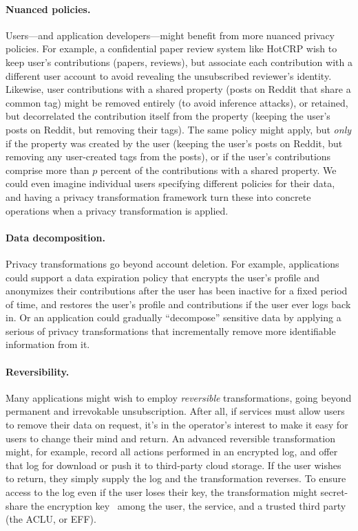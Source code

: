 \paragraph{Nuanced policies.}
%
Users---and application developers---might benefit from more nuanced privacy policies.
%
For example, a confidential paper review system like HotCRP wish to keep user's contributions
(papers, reviews), but associate each contribution with a different user account to avoid
revealing the unsubscribed reviewer's identity.
%
Likewise, user contributions with a shared property (\eg posts on Reddit that share a common
tag) might be removed entirely (to avoid inference attacks), or retained, but decorrelated the
contribution itself from the property (\eg keeping the user's posts on Reddit, but removing
their tags).
%
The same policy might apply, but \emph{only} if the property was created by the user (\eg keeping
the user's posts on Reddit, but removing any user-created tags from the posts), or if the user's
contributions comprise more than $p$ percent of the contributions with a shared property.
%
We could even imagine individual users specifying different policies for their data, and having a
privacy transformation framework turn these into concrete operations when a privacy transformation
is applied.
%

\paragraph{Data decomposition.}
%
Privacy transformations go beyond account deletion.
%
For example, applications could support a data expiration policy that encrypts the user's
profile and anonymizes their contributions after the user has been inactive for a fixed period of
time, and restores the user's profile and contributions if the user ever logs back in.
%
Or an application could gradually ``decompose'' sensitive data by applying a serious of
privacy transformations that incrementally remove more identifiable information from it.
%


\paragraph{Reversibility.}
%
Many applications might wish to employ \emph{reversible} transformations, going beyond permanent
and irrevokable unsubscription.
%
After all, if services must allow users to remove their data on request, it's in the operator's
interest to make it easy for users to change their mind and return.
%
An advanced reversible transformation might, for example, record all actions performed in an
encrypted log, and offer that log for download or push it to third-party cloud storage.
%
If the user wishes to return, they simply supply the log and the transformation reverses.
%
To ensure access to the log even if the user loses their key, the transformation might
secret-share the encryption key~\cite{secretsharing} among the user, the service, and a trusted
third party (\eg the ACLU, or EFF).
%



